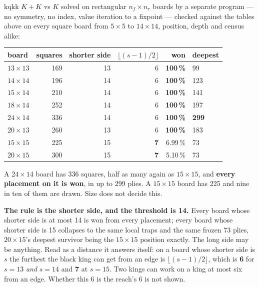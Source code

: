 \documentclass[10pt]{article}
\begin{document}
\begin{result}[title={Area is irrelevant. The shorter side is everything}]{kqkk}
$K\!+\!K$ vs $K$ solved on rectangular $n_f\times n_r$ boards by a separate
program --- no symmetry, no index, value iteration to a fixpoint --- checked
against the tables above on every square board from $5\times5$ to $14\times14$,
position, depth and census alike:

\begin{center}\small
\begin{tabular}{@{}lrrrrl@{}}
\toprule
board & squares & shorter side & \multicolumn{1}{c}{$\lfloor(s-1)/2\rfloor$} & won & deepest\\
\midrule
$13\times13$ & 169 & 13 & 6 & \textbf{100\,\%} & 99\\
$14\times14$ & 196 & 14 & 6 & \textbf{100\,\%} & 123\\
$15\times14$ & 210 & 14 & 6 & \textbf{100\,\%} & 141\\
$18\times14$ & 252 & 14 & 6 & \textbf{100\,\%} & 197\\
$24\times14$ & 336 & 14 & 6 & \textbf{100\,\%} & \textbf{299}\\
$20\times13$ & 260 & 13 & 6 & \textbf{100\,\%} & 183\\
\midrule
$15\times15$ & 225 & 15 & \textbf{7} & 6.99\,\% & 73\\
$20\times15$ & 300 & 15 & \textbf{7} & 5.10\,\% & 73\\
\bottomrule
\end{tabular}
\end{center}

A $24\times14$ board has 336 squares, half as many again as $15\times15$, and
\textbf{every placement on it is won}, in up to 299 plies. A $15\times15$ board
has 225 and nine in ten of them are drawn. Size does not decide this.
\label{sub:cap-hunt-why}
\end{result}

\noindent
\textbf{The rule is the shorter side, and the threshold is 14.} Every board
whose shorter side is at most 14 is won from every placement; every board whose
shorter side is 15 collapses to the same local traps and the same frozen 73
plies, $20\times15$'s deepest survivor being the $15\times15$ position exactly.
The long side may be anything. Read as a distance it answers itself: on a board
whose shorter side is $s$ the furthest the black king can get from an edge is
$\lfloor(s-1)/2\rfloor$, which is \textbf{6} for $s=13$ \emph{and} $s=14$ and
\textbf{7} at $s=15$. Two kings can work on a king at most six from an edge.
Whether this 6 is the reach's 6 is not shown.
\end{document}
